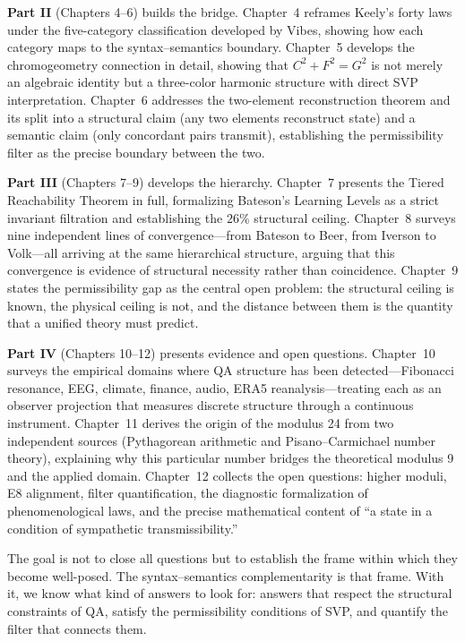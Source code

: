 \documentclass[11pt,a4paper]{article}
\begin{document}
\textbf{Part II} (Chapters 4--6) builds the bridge. Chapter~4 reframes
Keely's forty laws under the five-category classification developed by
Vibes, showing how each category maps to the syntax--semantics boundary.
Chapter~5 develops the chromogeometry connection in detail, showing that
$C^2 + F^2 = G^2$ is not merely an algebraic identity but a three-color
harmonic structure with direct SVP interpretation. Chapter~6 addresses
the two-element reconstruction theorem and its split into a structural
claim (any two elements reconstruct state) and a semantic claim (only
concordant pairs transmit), establishing the permissibility filter as
the precise boundary between the two.

\textbf{Part III} (Chapters 7--9) develops the hierarchy. Chapter~7
presents the Tiered Reachability Theorem in full, formalizing Bateson's
Learning Levels as a strict invariant filtration and establishing the
$26\%$ structural ceiling. Chapter~8 surveys nine independent lines of
convergence---from Bateson to Beer, from Iverson to Volk---all arriving
at the same hierarchical structure, arguing that this convergence is
evidence of structural necessity rather than coincidence. Chapter~9
states the permissibility gap as the central open problem: the structural
ceiling is known, the physical ceiling is not, and the distance between
them is the quantity that a unified theory must predict.

\textbf{Part IV} (Chapters 10--12) presents evidence and open questions.
Chapter~10 surveys the empirical domains where QA structure has been
detected---Fibonacci resonance, EEG, climate, finance, audio, ERA5
reanalysis---treating each as an observer projection that measures
discrete structure through a continuous instrument. Chapter~11 derives
the origin of the modulus 24 from two independent sources (Pythagorean
arithmetic and Pisano--Carmichael number theory), explaining why this
particular number bridges the theoretical modulus 9 and the applied
domain. Chapter~12 collects the open questions: higher moduli, E8
alignment, filter quantification, the diagnostic formalization of
phenomenological laws, and the precise mathematical content of ``a state
in a condition of sympathetic transmissibility.''

The goal is not to close all questions but to establish the frame within
which they become well-posed. The syntax--semantics complementarity is
that frame. With it, we know what kind of answers to look for: answers
that respect the structural constraints of QA, satisfy the permissibility
conditions of SVP, and quantify the filter that connects them.
\end{document}
